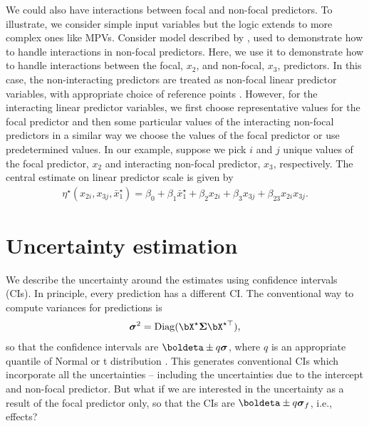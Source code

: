  We could also have interactions between focal and non-focal predictors. To illustrate, we consider simple input variables but the logic extends to more complex ones like MPVs. Consider model described by ,  used to demonstrate how to handle interactions in non-focal predictors. Here, we use it to demonstrate how to handle interactions between the focal, $x_2$, and non-focal, $x_3$, predictors. In this case, the non-interacting predictors are treated as non-focal linear predictor variables, with appropriate choice of reference points . However, for the interacting linear predictor variables, we first choose representative values for the focal predictor and then some particular values of the interacting non-focal predictors in a similar way we choose the values of the focal predictor or use predetermined values. In our example, suppose we pick $i$ and $j$ unique values of the focal predictor, $x_2$ and interacting non-focal predictor, $x_3$, respectively. The central estimate on linear predictor scale is given by
%
\begin{align*}
\eta^\star(x_{2i}, x_{3j}, {\bar{x}^\star_1}) = \beta_0 + \beta_1 \bar{x}^\star_1 + \beta_2x_{2i} + \beta_3x_{3j} + \beta_{23}x_{2i}x_{3j}.
\end{align*}
%

\section{Uncertainty estimation}

We describe the uncertainty around the estimates using confidence intervals (CIs). In principle, every prediction has a different CI. The conventional way to compute variances for predictions is 
%
\begin{align}\label{eq:conventional_variance}
\boldsymbol\sigma^2 = \mathrm{Diag}(\bX^\star \boldsymbol{\Sigma} \bX^{\star\top}), 
\end{align}
so that the confidence intervals are $\boldeta \pm q\boldsymbol\sigma$, where $q$ is an appropriate quantile of Normal or t distribution \citep{lenth2018package, fox2009effect}. This generates conventional CIs which incorporate all the uncertainties -- including the uncertainties due to the intercept and non-focal predictor.  But what if we are interested in the uncertainty as a result of the focal predictor only, so that the CIs are $\boldeta \pm q \boldsymbol \sigma_f$, i.e., effects? 

